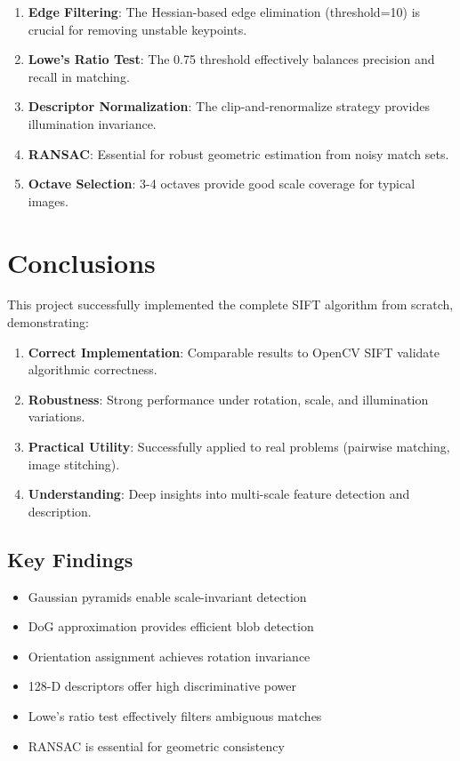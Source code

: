 \documentclass[12pt,a4paper]{article}
\begin{document}
\begin{enumerate}
    \item \textbf{Edge Filtering}: The Hessian-based edge elimination (threshold=10) is crucial for removing unstable keypoints.
    
    \item \textbf{Lowe's Ratio Test}: The 0.75 threshold effectively balances precision and recall in matching.
    
    \item \textbf{Descriptor Normalization}: The clip-and-renormalize strategy provides illumination invariance.
    
    \item \textbf{RANSAC}: Essential for robust geometric estimation from noisy match sets.
    
    \item \textbf{Octave Selection}: 3-4 octaves provide good scale coverage for typical images.
\end{enumerate}

\section{Conclusions}

This project successfully implemented the complete SIFT algorithm from scratch, demonstrating:

\begin{enumerate}
    \item \textbf{Correct Implementation}: Comparable results to OpenCV SIFT validate algorithmic correctness.
    
    \item \textbf{Robustness}: Strong performance under rotation, scale, and illumination variations.
    
    \item \textbf{Practical Utility}: Successfully applied to real problems (pairwise matching, image stitching).
    
    \item \textbf{Understanding}: Deep insights into multi-scale feature detection and description.
\end{enumerate}

\subsection{Key Findings}

\begin{itemize}
    \item Gaussian pyramids enable scale-invariant detection
    \item DoG approximation provides efficient blob detection
    \item Orientation assignment achieves rotation invariance
    \item 128-D descriptors offer high discriminative power
    \item Lowe's ratio test effectively filters ambiguous matches
    \item RANSAC is essential for geometric consistency
\end{itemize}
\end{document}
